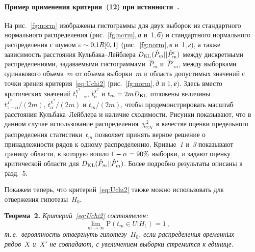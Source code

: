 \begin{multicols}{2}
\paragraph*{Пример применения критерия~(12) при истин\-ности~{}.}
На рис.~\ref{fg:norm} изображены гистограммы для двух выборок из стандартного нормального распределения
(рис.~\ref{fg:norm},\,\textit{а} и~1,\,\textit{б})
и стандартного нормального распределения с шумом
$\varepsilon\hm\sim 0{,}1{R}[0,1]$ (рис.~\ref{fg:norm},\,\textit{в} и~1,\,\textit{г}),
а также зависимость расстояния Кульбака--Лейблера
$D_{\mathrm{KL}}(\hat{P}_{m}||\hat{P}'_{m})$ между дискретными распределениями,
задаваемыми гистограммами~$\hat{P}_{m}$ и~$\hat{P}'_{m}$, между выборками
одинакового объема~$m$  от объема выборки~$m$ и область допустимых значений
с точки зрения критерия~\eqref{eq:Uchi2}
(рис.~\ref{fg:norm},\,\textit{д} и 1,\,\textit{е}).
Здесь вместо критических значений $\bar{t}^{\chi^2}_{1-\alpha}$,
$\bar{t}^{\chi^2}_{\alpha}$ и $t_m \hm= 2m{D}_{\KL}$ отложены величины
$\bar{t}^{\chi^2}_{1-\alpha}/(2m)$,  $\bar{t}^{\chi^2}_{\alpha}/(2m)$ и $t_m/(2m)$,
чтобы продемонстрировать масштаб расстояния Кульбака--Лейблера и наличие
сходимости. Рисунки показывают, что в данном случае использование
распределения~$\chi_{2\mathcal{N}}^2$ в качестве оценки предельного распределения статистики~$t_m$
позволяет принять верное решение о принадлежности рядов к одному  распределению.
Кривые~\textit{1} и~\textit{3} показывают границу области, в которую вошло $1\hm- \alpha \hm= 90\%$
выборки, и задают оценку критической области для
$D_{\mathrm{KL}}(\hat{P}_m||\hat{P}'_m)$. Более подробно результаты описаны в разд.~5.



Покажем теперь, что критерий~\eqref{eq:Uchi2} также можно использовать
для отвержения гипотезы~$H_0$.

\smallskip

\noindent
\textbf{Теорема~2.}
\textit{Критерий~\eqref{eq:Uchi2} состоятелен:
$$
\lim\limits_{m\rightarrow\infty} \mathrm{P}(t_m \in U | H_1) = 1\,,
$$
т.\,е.\ вероятность отвергнуть гипотезу~$H_0$, если распределения
временн$\acute{\mbox{ы}}$х рядов~$X$ и~$X'$ не совпадают, с увеличением выборки стремится к единице.}

\begin{figure*}[b] %
\vspace*{1pt}
\begin{center}
\mbox{%
\epsfxsize=164.105mm
}
\end{center}
\vspace*{-9pt}
\end{figure*}



\end{multicols}
